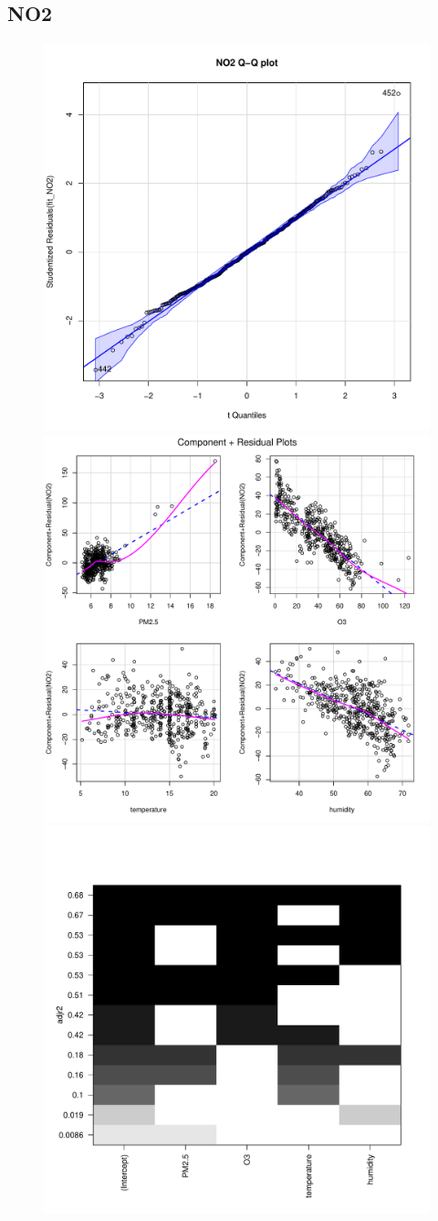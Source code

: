 \documentclass[a4paper,12pt,reqno]{report}
\begin{document}
\subsection{NO2}
\begin{figure}[H]
    \centering
    \vspace{-0.35cm}
    \includegraphics[width=0.4\linewidth]{figures/mul_reg_qqPlot_NO2.pdf}
    \includegraphics[width=0.4\linewidth]{figures/mul_reg_crPlots_NO2.pdf}
    \includegraphics[width=0.4\linewidth]{figures/mul_reg_adjr2_NO2.pdf}
\end{figure}
\end{document}
